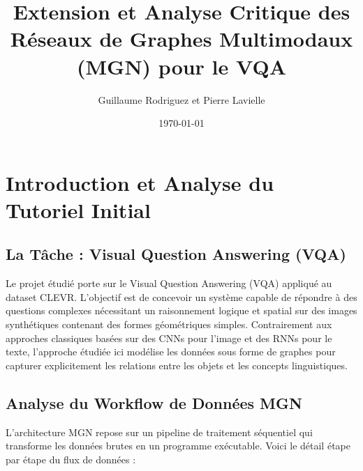 \documentclass[a4paper,11pt]{article}
\title{\textbf{Extension et Analyse Critique des Réseaux de Graphes Multimodaux (MGN) pour le VQA}}
\author{Guillaume Rodriguez et Pierre Lavielle}
\date{\today}
\begin{document}
\maketitle

\section{Introduction et Analyse du Tutoriel Initial}

\subsection{La Tâche : Visual Question Answering (VQA)}
Le projet étudié porte sur le Visual Question Answering (VQA) appliqué au dataset CLEVR. L'objectif est de concevoir un système capable de répondre à des questions complexes nécessitant un raisonnement logique et spatial sur des images synthétiques contenant des formes géométriques simples. Contrairement aux approches classiques basées sur des CNNs pour l'image et des RNNs pour le texte, l'approche étudiée ici modélise les données sous forme de graphes pour capturer explicitement les relations entre les objets et les concepts linguistiques.

\subsection{Analyse du Workflow de Données MGN}
L'architecture MGN repose sur un pipeline de traitement séquentiel qui transforme les données brutes en un programme exécutable. Voici le détail étape par étape du flux de données :
\end{document}
